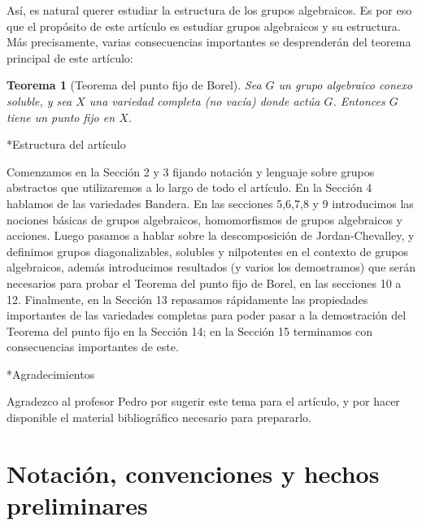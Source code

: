 \documentclass[spanish,12pt]{amsart}
\makeatletter
\renewcommand\subsection{\@startsection{subsection}{2}%
  \z@{.5\linespacing\@plus.7\linespacing}{-.5em}%
  {\normalfont\sffamily}}
\newtheorem{theorem}{Teorema}[section]
\theoremstyle{definition}
\theoremstyle{remark}
\numberwithin{equation}{section}
\makeatother
\begin{document}
Así, es natural querer estudiar la estructura de los grupos algebraicos. Es por eso que el propósito de este artículo es estudiar grupos algebraicos y su estructura. Más precisamente, varias consecuencias importantes se desprenderán del teorema principal de este artículo:

\begin{theorem}[Teorema del punto fijo de Borel]
Sea $G$ un grupo algebraico conexo soluble, y sea $X$ una variedad completa (no vacía) donde actúa $G$. Entonces $G$ tiene un punto fijo en $X$.
\end{theorem}

\subsection*{Estructura del artículo}

Comenzamos en la Sección 2 y 3 fijando notación y lenguaje sobre grupos abstractos que utilizaremos a lo largo de todo el artículo. En la Sección 4 hablamos de las variedades Bandera. En las secciones 5,6,7,8 y 9 introducimos las nociones básicas de grupos algebraicos, homomorfismos de grupos algebraicos y acciones. Luego pasamos a hablar sobre la descomposición de Jordan-Chevalley, y definimos grupos diagonalizables, solubles y nilpotentes en el contexto de grupos algebraicos, además introducimos resultados (y varios los demostramos) que serán necesarios para probar el Teorema del punto fijo de Borel, en las secciones 10 a 12. Finalmente, en la Sección 13 repasamos rápidamente las propiedades importantes de las variedades completas para poder pasar a la demostración del Teorema del punto fijo en la Sección 14; en la Sección 15 terminamos con consecuencias importantes de este.



\subsection*{Agradecimientos}

Agradezco al profesor Pedro por sugerir este tema para el artículo, y por hacer disponible el material bibliográfico necesario para prepararlo.

\section{Notación, convenciones y hechos preliminares}
\end{document}
